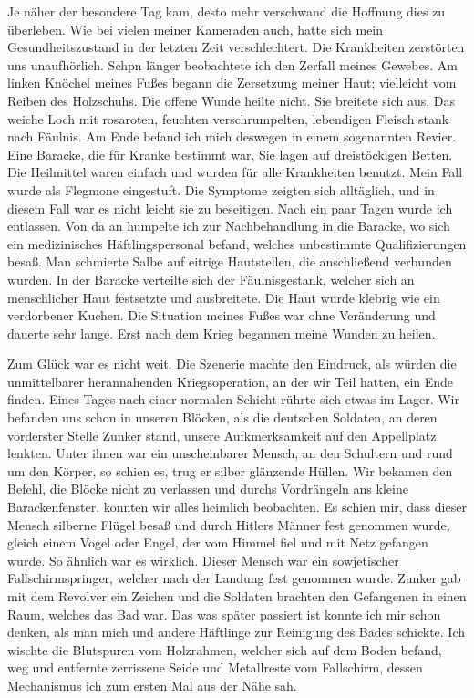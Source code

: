Je näher der besondere Tag kam, desto mehr verschwand die Hoffnung dies zu überleben. Wie bei vielen meiner Kameraden auch, hatte sich mein Gesundheitszustand in der letzten Zeit verschlechtert. Die Krankheiten zerstörten uns unaufhörlich. Schpn länger beobachtete ich den Zerfall meines Gewebes. Am linken Knöchel meines Fußes begann die Zersetzung meiner Haut; vielleicht vom Reiben des Holzschuhs. Die offene Wunde heilte nicht. Sie breitete sich aus. Das weiche Loch mit rosaroten, feuchten verschrumpelten, lebendigen Fleisch stank nach Fäulnis. Am Ende befand ich mich deswegen in einem sogenannten Revier. Eine Baracke, die für Kranke bestimmt war, Sie lagen auf dreistöckigen Betten. Die Heilmittel waren einfach und wurden für alle Krankheiten benutzt. Mein Fall wurde als Flegmone eingestuft. Die Symptome zeigten sich alltäglich, und in diesem Fall war es nicht leicht sie zu beseitigen. Nach ein paar Tagen wurde ich entlassen. Von da an humpelte ich zur Nachbehandlung in die Baracke, wo sich ein medizinisches Häftlingspersonal befand, welches unbestimmte Qualifizierungen besaß. Man schmierte Salbe auf eitrige Hautstellen, die anschließend verbunden wurden. In der Baracke verteilte sich der Fäulnisgestank, welcher sich an menschlicher Haut festsetzte und ausbreitete. Die Haut wurde  klebrig wie ein verdorbener Kuchen. Die Situation meines Fußes war ohne Veränderung und dauerte sehr lange. Erst nach dem Krieg begannen meine Wunden zu heilen.

Zum Glück war es nicht weit. Die Szenerie machte den Eindruck, als würden die unmittelbarer herannahenden Kriegsoperation, an der wir Teil hatten, ein Ende finden. Eines Tages nach einer normalen Schicht rührte sich etwas im Lager.
Wir befanden uns schon in unseren Blöcken, als die deutschen Soldaten, an deren vorderster Stelle Zunker stand, unsere Aufkmerksamkeit auf den Appellplatz lenkten. Unter ihnen war ein unscheinbarer Mensch, an den Schultern und rund um den Körper, so schien es, trug er silber glänzende Hüllen. Wir bekamen den Befehl, die Blöcke nicht zu verlassen und durchs Vordrängeln ans kleine Barackenfenster, konnten wir alles heimlich beobachten. Es schien mir, dass dieser Mensch silberne Flügel besaß und durch Hitlers Männer fest genommen wurde, gleich einem Vogel oder Engel, der vom Himmel fiel und mit Netz gefangen  wurde. So ähnlich war es wirklich. Dieser Mensch war ein sowjetischer Fallschirmspringer, welcher nach der Landung fest genommen wurde. Zunker gab mit dem Revolver ein Zeichen und die Soldaten brachten den Gefangenen in einen Raum, welches das Bad war. Das was später passiert ist konnte ich mir schon denken, als man mich und andere Häftlinge zur Reinigung des Bades schickte. Ich wischte die Blutspuren vom Holzrahmen, welcher sich auf dem Boden befand, weg und entfernte zerrissene Seide und Metallreste vom Fallschirm, dessen Mechanismus ich zum ersten Mal aus der Nähe sah.

